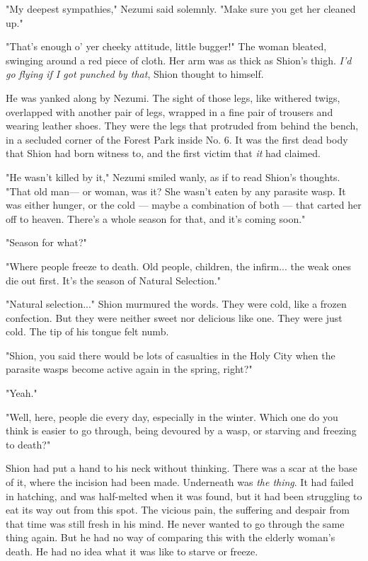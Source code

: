 "My deepest sympathies," Nezumi said solemnly. "Make sure you get her
cleaned up."

"That's enough o' yer cheeky attitude, little bugger!" The woman
bleated, swinging around a red piece of cloth. Her arm was as thick as
Shion's thigh. \emph{I'd go flying if I got punched by that}, Shion thought to
himself.

He was yanked along by Nezumi. The sight of those legs, like withered
twigs, overlapped with another pair of legs, wrapped in a fine pair of
trousers and wearing leather shoes. They were the legs that protruded
from behind the bench, in a secluded corner of the Forest Park inside
No. 6. It was the first dead body that Shion had born witness to, and
the first victim that \emph{it} had claimed.

"He wasn't killed by it," Nezumi smiled wanly, as if to read Shion's
thoughts. "That old man--- or woman, was it? She wasn't eaten by any
parasite wasp. It was either hunger, or the cold --- maybe a combination
of both --- that carted her off to heaven. There's a whole season for
that, and it's coming soon."

"Season for what?"

"Where people freeze to death. Old people, children, the infirm... the
weak ones die out first. It's the season of Natural Selection."

"Natural selection..." Shion murmured the words. They were cold, like a
frozen confection. But they were neither sweet nor delicious like one.
They were just cold. The tip of his tongue felt numb.

"Shion, you said there would be lots of casualties in the Holy City when
the parasite wasps become active again in the spring, right?"

"Yeah."

"Well, here, people die every day, especially in the winter. Which one
do you think is easier to go through, being devoured by a wasp, or
starving and freezing to death?"

Shion had put a hand to his neck without thinking. There was a scar at
the base of it, where the incision had been made. Underneath was \emph{the
thing}. It had failed in hatching, and was half-melted when it was found,
but it had been struggling to eat its way out from this spot. The
vicious pain, the suffering and despair from that time was still fresh
in his mind. He never wanted to go through the same thing again. But he
had no way of comparing this with the elderly woman's death. He had no
idea what it was like to starve or freeze.


